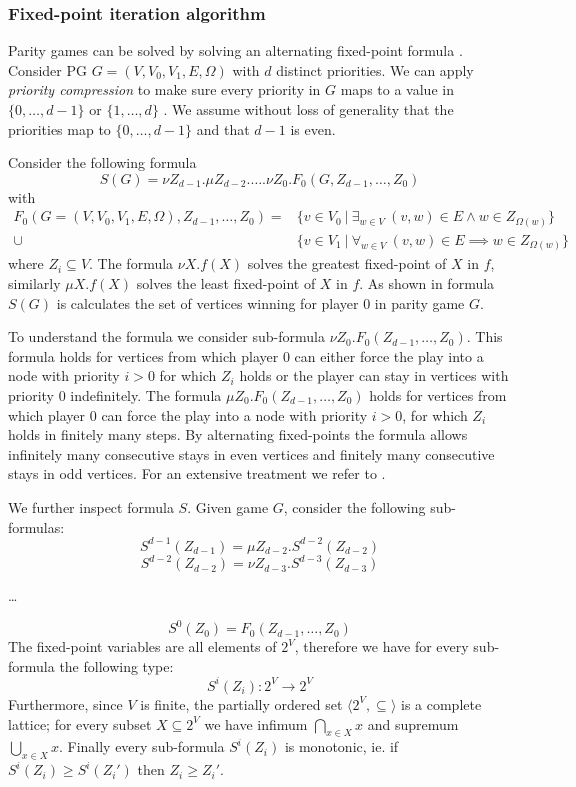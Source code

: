 \subsubsection{Fixed-point iteration algorithm}
Parity games can be solved by solving an alternating fixed-point formula \cite{WALUKIEWICZ2002311}. Consider PG $G = (V,V_0,V_1, E, \Omega)$ with $d$ distinct priorities. We can apply \textit{priority compression} to make sure every priority in $G$ maps to a value in $\{0,\dots,d-1\}$ or $\{1, \dots, d\}$ \cite{SolvingInPractice,FPITE}. We assume without loss of generality that the priorities map to $\{0,\dots,d-1\}$ and that $d-1$ is even. 

Consider the following formula
\[ S(G) = \nu Z_{d-1}. \mu Z_{d-2}. \dots . \nu Z_0. F_0(G,Z_{d-1},\dots,Z_0) \]
with
\begin{align*}
 F_0(G = (V,V_0,V_1,E,\Omega),Z_{d-1},\dots,Z_0) = &\{ v \in V_0\ |\ \exists_{w\in V}\ (v,w) \in E \wedge w\in Z_{\Omega(w)} \}\\
  \cup &\{ v \in V_1\ |\ \forall_{w\in V}\ (v,w) \in E \implies w\in Z_{\Omega(w)} \}
\end{align*}
where $Z_i \subseteq V$. The formula $\nu X. f(X)$ solves the greatest fixed-point of $X$ in $f$, similarly $\mu X.f(X)$ solves the least fixed-point of $X$ in $f$. As shown in \cite{WALUKIEWICZ2002311} formula $S(G)$ is calculates the set of vertices winning for player 0 in parity game $G$.

To understand the formula we consider sub-formula $\nu Z_0. F_0(Z_{d-1},\dots,Z_0)$. This formula holds for vertices from which player $0$ can either force the play into a node with priority $i > 0$ for which $Z_i$ holds or the player can stay in vertices with priority $0$ indefinitely. The formula $\mu Z_0. F_0(Z_{d-1},\dots,Z_0)$ holds for vertices from which player $0$ can force the play into a node with priority $i > 0$, for which $Z_i$ holds in finitely many steps. By alternating fixed-points the formula allows infinitely many consecutive stays in even vertices and finitely many consecutive stays in odd vertices. For an extensive treatment we refer to \cite{WALUKIEWICZ2002311}.

We further inspect formula $S$. Given game $G$, consider the following sub-formulas:
\[ S^{d-1}(Z_{d-1}) = \mu Z_{d-2}.S^{d-2}(Z_{d-2})\]
\[ S^{d-2}(Z_{d-2}) = \nu Z_{d-3}.S^{d-3}(Z_{d-3})\]
\begin{center}
	\dots
\end{center}
\[ S^{0}(Z_0) = F_0(Z_{d-1},\dots,Z_0)\]
The fixed-point variables are all elements of $2^V$, therefore we have for every sub-formula the following type:
\[ S^i(Z_i) : 2^V \rightarrow 2^V \]
Furthermore, since $V$ is finite, the partially ordered set $\langle 2^V, \subseteq \rangle$ is a complete lattice; for every subset $X \subseteq 2^V$ we have infimum $\bigcap_{x \in X} x$ and supremum $\bigcup_{x \in X} x$. Finally every sub-formula $S^i(Z_i)$ is monotonic, ie. if $S^i(Z_i) \geq S^i(Z_i')$ then $Z_i \geq Z_i'$.

